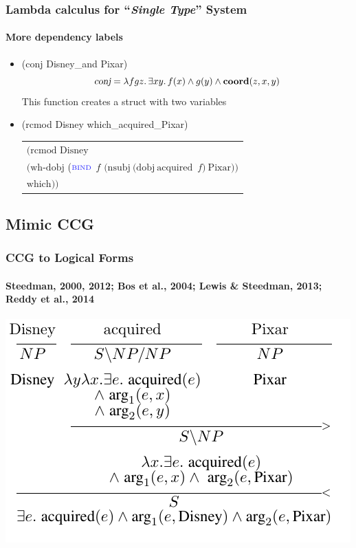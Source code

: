 \documentclass[mathserif,12pt]{beamer}
\newcommand{\hlight}[1]{{\color{blue!80} #1}}
\renewcommand{\land}{\wedge}
\newcommand{\lspace}{.\,}
\newcommand{\bind}{\textsc{bind}}
\begin{document}
\begin{frame}[noframenumbering]
\frametitle{Lambda calculus for ``\textit{Single Type}'' System}
\framesubtitle{More dependency labels}
\begin{itemize}
\item (conj Disney\_and Pixar)
  $$\textsl{conj} = \lambda f g z \lspace \exists x y \lspace f(x) \land g(y) \land \textbf{coord}(z,x,y)$$
 This function creates a struct with two variables
 \vspace{1cm}
 
 \item<2-> (rcmod Disney which\_acquired\_Pixar)
 \begin{small}
 \begin{tabular}{l}\\
 $\mathrm{(rcmod}$  $\mathrm{Disney}$ \\ 
  \hspace*{1cm} $\mathrm{(wh}$-$\mathrm{dobj}$
  ($\hlight{\bind}$ $f$ $\mathrm{(nsubj~(dobj~acquired}$~$f$$\mathrm{)~Pixar))}$ \\
 \hspace*{2.5cm} $\mathrm{which))}$
 \end{tabular}
 \end{small}
\end{itemize}
\end{frame}

\subsection{Mimic CCG}
\begin{frame}[noframenumbering]
 \frametitle{CCG to Logical Forms}
 \framesubtitle{Steedman, 2000, 2012; Bos et al., 2004; Lewis \& Steedman, 2013; Reddy et al., 2014}
 \centering
 \includegraphics[scale=1]{figures/ccg-transitive}
\end{frame}
\end{document}
